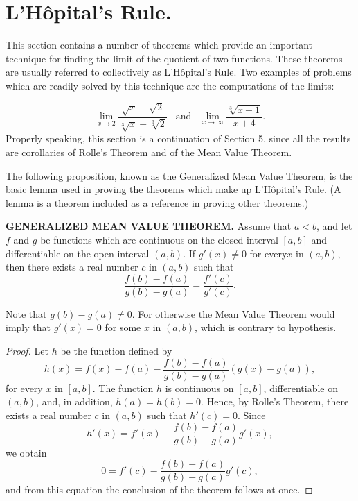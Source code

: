 \section{L'H\^{o}pital's Rule.}\label{sec 2.7}
This section contains a number of theorems which provide an important technique for finding the limit of the quotient of two functions. These theorems are usually referred to collectively as L'H\^{o}pital's Rule. Two examples of problems which are readily solved by this technique are the computations of the limits:  

$$
\lim_{x \rightarrow 2}\frac{\sqrt x - \sqrt 2}{\sqrt[3]{x} - \sqrt[3]{2}}
\;\;\;\mbox{and}\;\;\; \lim_{x \rightarrow \infty}\frac{\sqrt[3]{x + 1}}{x + 4}.
$$
\noindent Properly speaking, this section is a continuation of Section 5, since all the results are corollaries of Rolle's Theorem and of the Mean Value Theorem.

The following proposition, known as the Generalized Mean Value Theorem, is the basic lemma used in proving the theorems which make up L'H\^{o}pital's Rule. (A lemma is a theorem included as a reference in proving other theorems.)

\begin{theorem} %
\textbf{GENERALIZED MEAN VALUE THEOREM.}  Assume that $a < b$, and let $f$ and $g$ be functions which are continuous on the closed interval $[a, b]$ and differentiable on the open interval $(a, b)$. If $g'(x) \neq 0$ for every$ x$ in $(a, b)$, then there exists a real number $c$ in $(a, b)$ such that
$$
\frac{f(b) - f(a)}{g(b) - g(a)} = \frac{f'(c)}{g'(c)}.
$$
\end{theorem}

Note that $g(b)-g(a) \neq 0$. For otherwise the Mean Value Theorem would imply that $g'(x) = 0$ for some $x$ in $(a, b)$, which is contrary to hypothesis.

\begin{proof}
Let $h$ be the function defined by 
$$
h(x) = f(x) - f(a) -\frac{f(b) - f(a)}{g(b) - g(a)} (g(x) - g(a)),
$$
for every $x$ in $[a, b]$. The function $h$ is continuous on $[a, b]$, differentiable on $(a, b)$, and, in addition, $h(a) = h(b) = 0$. Hence, by Rolle's Theorem, there
exists a real number $c$ in $(a, b)$ such that $h'(c) = 0$. Since
$$
h'(x) = f'(x) - {\frac{f(b) - f(a)}{g(b) - g(a)}} g'(x), 
$$
we obtain
$$
0 = f'(c) - {\frac{f(b) - f(a)}{g(b) - g(a)}} g'(c), 
$$
and from this equation the conclusion of the theorem follows at once.
\end{proof}

